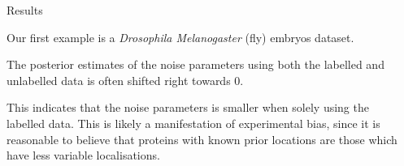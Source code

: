 \documentclass[final, 10pt]{beamer}
\newlength{\onecolwid}
\newlength{\twocolwid}
\begin{document}
\begin{frame}[t]
\begin{columns}[t]
\begin{column}{\twocolwid}
\begin{columns}[t,totalwidth=\twocolwid]
\begin{column}{\onecolwid}

    \end{column} %

    \begin{column}{\onecolwid}\vspace{-.6in} %


      \begin{block}{Results}
      	\begin{itemize}
      	\small{
      	\item Our first example is a \textit{Drosophila Melanogaster} (fly) embryos dataset.
      	\item The posterior estimates of the noise parameters using both the labelled and unlabelled data is often shifted right towards $0$.
      	\item This indicates that the noise parameters is smaller when solely using the labelled data. This is likely a manifestation of experimental bias, since it is reasonable to believe that proteins with known prior locations are those which have less variable localisations.
      	
}
\end{itemize}
\end{block}
\end{column}
\end{columns}
\end{column}
\end{columns}
\end{frame}
\end{document}
